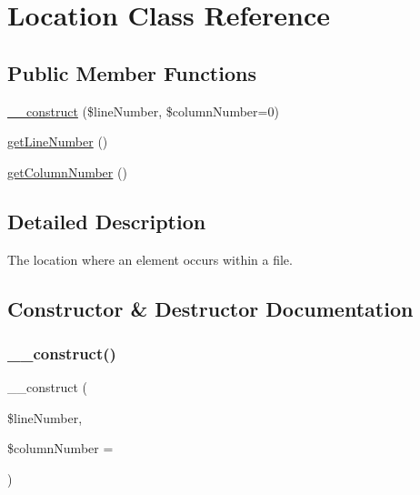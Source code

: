 \hypertarget{classphp_documentor_1_1_reflection_1_1_location}{}\section{Location Class Reference}
\label{classphp_documentor_1_1_reflection_1_1_location}
\subsection*{Public Member Functions}
\begin{DoxyCompactItemize}
\item 
\mbox{\hyperlink{classphp_documentor_1_1_reflection_1_1_location_a50f67f7e7fccf06b4a368d3774ca0ac4}{\+\_\+\+\_\+construct}} (\$line\+Number, \$column\+Number=0)
\item 
\mbox{\hyperlink{classphp_documentor_1_1_reflection_1_1_location_ac145ff339a8c5cb3df6b29f76bd1168e}{get\+Line\+Number}} ()
\item 
\mbox{\hyperlink{classphp_documentor_1_1_reflection_1_1_location_af1294bbbaac3cf01e5a0ba99a3a79054}{get\+Column\+Number}} ()
\end{DoxyCompactItemize}


\subsection{Detailed Description}
The location where an element occurs within a file. 

\subsection{Constructor \& Destructor Documentation}
\mbox{\label{classphp_documentor_1_1_reflection_1_1_location_a50f67f7e7fccf06b4a368d3774ca0ac4}} 
\subsubsection{\texorpdfstring{\+\_\+\+\_\+construct()}{\_\_construct()}}
{\footnotesize\ttfamily \+\_\+\+\_\+construct (\begin{DoxyParamCaption}\item[{}]{\$line\+Number,  }\item[{}]{\$column\+Number = {} }\end{DoxyParamCaption})}

